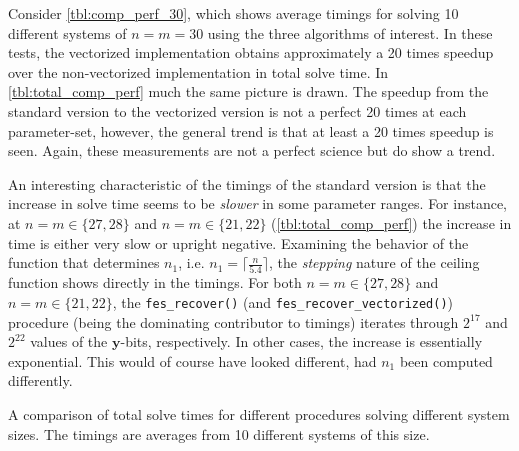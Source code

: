 Consider \cref{tbl:comp_perf_30}, which shows average timings for solving 10 different systems of $n = m = 30$ using the three algorithms of interest. In these tests, the vectorized implementation obtains approximately a 20 times speedup over the non-vectorized implementation in total solve time. In \cref{tbl:total_comp_perf} much the same picture is drawn. The speedup from the standard version to the vectorized version is not a perfect 20 times at each parameter-set, however, the general trend is that at least a 20 times speedup is seen. Again, these measurements are not a perfect science but do show a trend. 

An interesting characteristic of the timings of the standard version is that the increase in solve time seems to be \textit{slower} in some parameter ranges. For instance, at $n = m \in \{27, 28\}$ and $n = m \in \{21,22\}$ (\cref{tbl:total_comp_perf}) the increase in time is either very slow or upright negative. Examining the behavior of the function that determines $n_1$, i.e. $n_1 = \lceil \frac{n}{5.4} \rceil$, the \textit{stepping} nature of the ceiling function shows directly in the timings. For both $n = m \in \{27, 28\}$ and $n = m \in \{21,22\}$, the \texttt{fes\_recover()} (and \texttt{fes\_recover\_vectorized()}) procedure (being the dominating contributor to timings) iterates through $2^{17}$ and $2^{22}$ values of the $\mathbf{y}$-bits, respectively. In other cases, the increase is essentially exponential. This would of course have looked different, had $n_1$ been computed differently.

\begin{table}[t]
    \begin{center}
    \end{center}
    \caption{A comparison of total solve times for different procedures solving different system sizes. The timings are averages from 10 different systems of this size.} \label{tbl:total_comp_perf}
\end{table}

